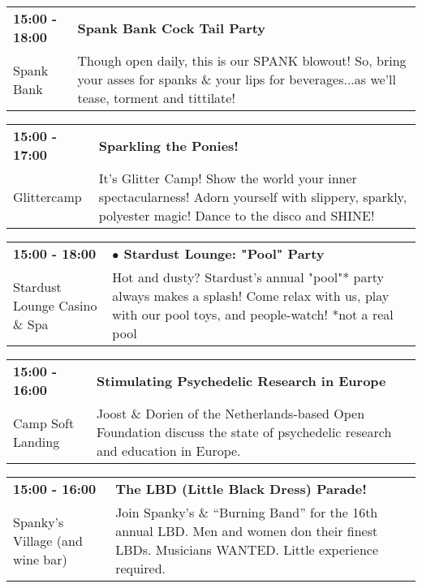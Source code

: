 \begin{tabular}{ p{1in} p{2.2in} }
    \textbf{15:00 - 18:00} & \textbf{Spank Bank Cock Tail Party} \\
    Spank Bank \newline  & Though open daily, this is our SPANK blowout! So, bring your asses for spanks \& your lips for beverages...as we'll tease, torment and tittilate! \\
    \hline 
\end{tabular}
    
\begin{tabular}{ p{1in} p{2.2in} }
    \textbf{15:00 - 17:00} & \textbf{Sparkling the Ponies!} \\
    Glittercamp \newline  & It's Glitter Camp! Show the world your inner spectacularness!  Adorn yourself with slippery, sparkly, polyester magic!  Dance to the disco and SHINE! \\
    \hline 
\end{tabular}
    
\begin{tabular}{ p{1in} p{2.2in} }
    \textbf{15:00 - 18:00} & \textbf{$\bullet$	Stardust Lounge: "Pool" Party} \\
    Stardust Lounge Casino \& Spa \newline  & Hot and dusty? Stardust's annual "pool"* party always makes a splash! Come relax with us, play with our pool toys, and people-watch! *not a real pool \\
    \hline 
\end{tabular}
    
\begin{tabular}{ p{1in} p{2.2in} }
    \textbf{15:00 - 16:00} & \textbf{Stimulating Psychedelic Research in Europe} \\
    Camp Soft Landing \newline  & Joost \& Dorien of the Netherlands-based Open Foundation discuss the state of psychedelic research and education in Europe. \\
    \hline 
\end{tabular}
    
\begin{tabular}{ p{1in} p{2.2in} }
    \textbf{15:00 - 16:00} & \textbf{The LBD (Little Black Dress) Parade!} \\
    Spanky's Village (and wine bar) \newline  & Join Spanky's \& ``Burning Band'' for the 16th annual LBD.  Men and women don their finest LBDs.  Musicians WANTED.  Little experience required. \\
    \hline 
\end{tabular}
    

